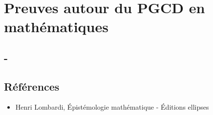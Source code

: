 \chapter{Preuves autour du PGCD en mathématiques}


\section{-}

\section{Références}

\begin{itemize}
	\item Henri Lombardi, Épistémologie mathématique - Éditions ellipses
\end{itemize}